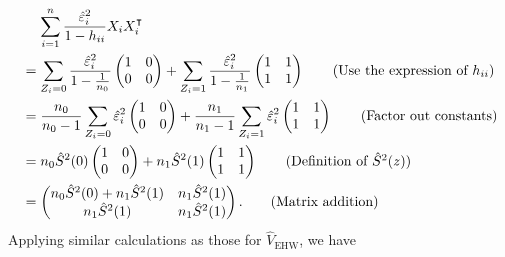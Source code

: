 \documentclass[10pt]{article}
\begin{document}
\begin{align*}
  &\mathrel{\phantom{=}} \sum_{i=1}^n \frac{\hat{\varepsilon}_i^2}{1 - h_{ii}} X_i X_i^\intercal \\
  &= \sum_{Z_i = 0} \frac{\hat{\varepsilon}_i^2}{1 - \frac{1}{n_0}} 
    \begin{pmatrix}
      1 & 0 \\
      0 & 0
    \end{pmatrix}
    + \sum_{Z_i = 1} \frac{\hat{\varepsilon}_i^2}{1 - \frac{1}{n_1}} 
    \begin{pmatrix}
      1 & 1 \\
      1 & 1
    \end{pmatrix} \tag{Use the expression of $h_{ii}$} \\
  &= \frac{n_0}{n_0 - 1} \sum_{Z_i = 0} \hat{\varepsilon}_i^2
    \begin{pmatrix}
      1 & 0 \\
      0 & 0
    \end{pmatrix}
    + \frac{n_1}{n_1 - 1} \sum_{Z_i = 1} \hat{\varepsilon}_i^2
    \begin{pmatrix}
      1 & 1 \\
      1 & 1
    \end{pmatrix} \tag{Factor out constants} \\
  &= n_0 \hat{S}^2(0)
    \begin{pmatrix}
      1 & 0 \\
      0 & 0
    \end{pmatrix}
    + n_1 \hat{S}^2(1)
    \begin{pmatrix}
      1 & 1 \\
      1 & 1
    \end{pmatrix} \tag{Definition of $\hat{S}^2(z)$} \\
  &= \begin{pmatrix}
      n_0 \hat{S}^2(0) + n_1 \hat{S}^2(1) & n_1 \hat{S}^2(1) \\
      n_1 \hat{S}^2(1) & n_1 \hat{S}^2(1)
    \end{pmatrix}. \tag{Matrix addition}
\end{align*}
Applying similar calculations as those for $\hat{V}_{\text{EHW}}$,
we have
\end{document}
